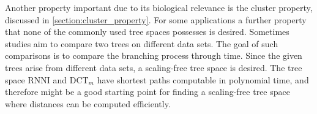 \documentclass[11pt]{amsart}
\newcommand{\rnni}{\mathrm{RNNI}}
\newcommand{\dtt}{\mathrm{DCT}}
\newcommand{\summary}[1]{} %
\begin{document}
\summary{scaling-free tree space}
Another property important due to its biological relevance is the cluster property, discussed in \autoref{section:cluster_property}.
For some applications a further property that none of the commonly used tree spaces possesses is desired.
Sometimes studies aim to compare two trees on different data sets.
The goal of such comparisons is to compare the branching process through time.
Since the given trees arise from different data sets, a scaling-free tree space is desired.
The tree space $\rnni$ and $\dtt_m$ have shortest paths computable in polynomial time, and therefore might be a good starting point for finding a scaling-free tree space where distances can be computed efficiently.

\printbibliography
\end{document}
